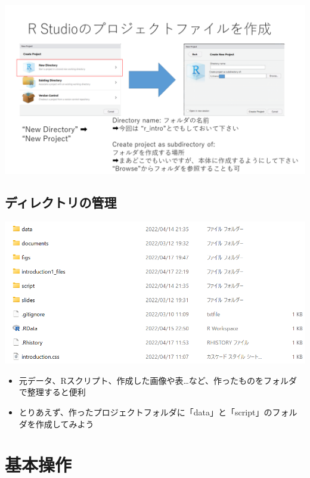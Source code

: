 \documentclass[
]{ltjsarticle}
\providecommand{\tightlist}{%
  \setlength{\itemsep}{0pt}\setlength{\parskip}{0pt}}
\begin{document}
\begin{center}\includegraphics[width=0.95\linewidth]{figs/create_repository2} \end{center}

\hypertarget{ux30c7ux30a3ux30ecux30afux30c8ux30eaux306eux7ba1ux7406}{%
\subsection{ディレクトリの管理}\label{ux30c7ux30a3ux30ecux30afux30c8ux30eaux306eux7ba1ux7406}}

\begin{center}\includegraphics[width=0.95\linewidth]{figs/directory_example} \end{center}

\begin{itemize}
\tightlist
\item
  元データ、Rスクリプト、作成した画像や表\ldots など、作ったものをフォルダで整理すると便利
\item
  とりあえず、作ったプロジェクトフォルダに「data」と「script」のフォルダを作成してみよう
\end{itemize}

\hypertarget{ux57faux672cux64cdux4f5c}{%
\section{基本操作}\label{ux57faux672cux64cdux4f5c}}
\end{document}
